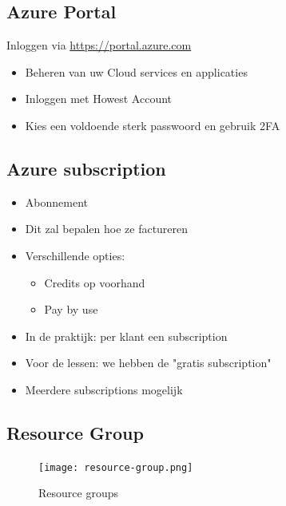 \documentclass{article}
\begin{document}
\subsection{Azure Portal}

Inloggen via \url{https://portal.azure.com}

\begin{itemize}
    \item Beheren van uw Cloud services en applicaties
    \item Inloggen met Howest Account
    \item Kies een voldoende sterk passwoord en gebruik 2FA
\end{itemize}

\subsection{Azure subscription}
\begin{itemize}
    \item Abonnement
    \item Dit zal bepalen hoe ze factureren
    \item Verschillende opties:
    \begin{itemize}
        \item Credits op voorhand
        \item Pay by use
    \end{itemize}
    \item In de praktijk: per klant een subscription
    \item Voor de lessen: we hebben de "gratis subscription"
    \item Meerdere subscriptions mogelijk
\end{itemize}

\subsection{Resource Group}

\begin{figure}[H]
    \centering
    \texttt{[image: resource-group.png]}
    \caption{Resource groups}
\end{figure}
\end{document}
